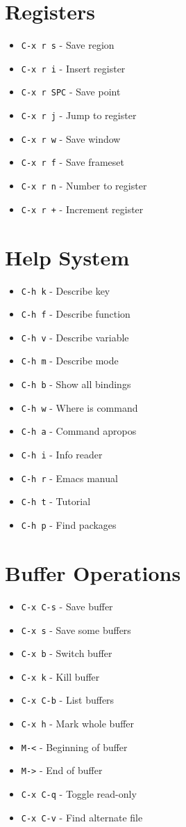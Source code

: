\documentclass[6pt,landscape]{article}
\newcommand{\key}[1]{\texttt{#1}}
\begin{document}
\begin{multicols*}{5}
\section*{Registers}
\begin{itemize}[leftmargin=*,itemsep=0pt,parsep=0pt,topsep=0pt]
\item \key{C-x r s} - Save region
\item \key{C-x r i} - Insert register
\item \key{C-x r SPC} - Save point
\item \key{C-x r j} - Jump to register
\item \key{C-x r w} - Save window
\item \key{C-x r f} - Save frameset
\item \key{C-x r n} - Number to register
\item \key{C-x r +} - Increment register
\end{itemize}

\section*{Help System}
\begin{itemize}[leftmargin=*,itemsep=0pt,parsep=0pt,topsep=0pt]
\item \key{C-h k} - Describe key
\item \key{C-h f} - Describe function
\item \key{C-h v} - Describe variable
\item \key{C-h m} - Describe mode
\item \key{C-h b} - Show all bindings
\item \key{C-h w} - Where is command
\item \key{C-h a} - Command apropos
\item \key{C-h i} - Info reader
\item \key{C-h r} - Emacs manual
\item \key{C-h t} - Tutorial
\item \key{C-h p} - Find packages
\end{itemize}

\section*{Buffer Operations}
\begin{itemize}[leftmargin=*,itemsep=0pt,parsep=0pt,topsep=0pt]
\item \key{C-x C-s} - Save buffer
\item \key{C-x s} - Save some buffers
\item \key{C-x b} - Switch buffer
\item \key{C-x k} - Kill buffer
\item \key{C-x C-b} - List buffers
\item \key{C-x h} - Mark whole buffer
\item \key{M-<} - Beginning of buffer
\item \key{M->} - End of buffer
\item \key{C-x C-q} - Toggle read-only
\item \key{C-x C-v} - Find alternate file
\end{itemize}


\end{multicols*}
\end{document}
